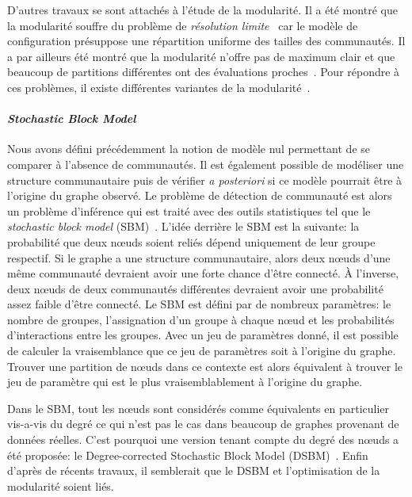 D'autres travaux se sont attachés à l'étude de la modularité.
Il a été montré que la modularité souffre du problème de \emph{résolution limite}~\cite{Fortunato2007,Lancichinetti2011} car le modèle de configuration présuppose une répartition uniforme des tailles des communautés.
Il a par ailleurs été montré que la modularité n'offre pas de maximum clair et que beaucoup de partitions différentes ont des évaluations proches~\cite{Good2010}.
Pour répondre à ces problèmes, il existe différentes variantes de la modularité~\cite{Reichardt2006,Delvenne2010}.


\paragraph{\emph{Stochastic Block Model}}
Nous avons défini précédemment la notion de modèle nul permettant de se comparer à l'absence de communautés.
Il est également possible de modéliser une structure communautaire puis de vérifier \emph{a posteriori} si ce modèle pourrait être à l'origine du graphe observé.
Le problème de détection de communauté est alors un problème d'inférence qui est traité avec des outils statistiques tel que le \emph{stochastic block model} (SBM)~\cite{Holland1983a,Nowicki2001}.
L'idée derrière le SBM est la suivante: la probabilité que deux n\oe uds soient reliés dépend uniquement de leur groupe respectif.
Si le graphe a une structure communautaire, alors deux n\oe uds d'une même communauté devraient avoir une forte chance d'être connecté.
\`A l'inverse, deux n\oe uds de deux communautés différentes devraient avoir une probabilité assez faible d'être connecté.
Le SBM est défini par de nombreux paramètres: le nombre de groupes, l'assignation d'un groupe à chaque n\oe ud et les probabilités d'interactions entre les groupes.
Avec un jeu de paramètres donné, il est possible de calculer la vraisemblance que ce jeu de paramètres soit à l'origine du graphe.
Trouver une partition de n\oe uds dans ce contexte est alors équivalent à trouver le jeu de paramètre qui est le plus vraisemblablement à l'origine du graphe.

Dans le SBM, tout les n\oe uds sont considérés comme équivalents en particulier vis-a-vis du degré ce qui n'est pas le cas dans beaucoup de graphes provenant de données réelles.
C'est pourquoi une version tenant compte du degré des n\oe uds a été proposée: le Degree-corrected Stochastic Block Model (DSBM)~\cite{Karrer2011}.
Enfin d'après de récents travaux\cite{Newman2016}, il semblerait que le DSBM et l'optimisation de la modularité soient liés.

